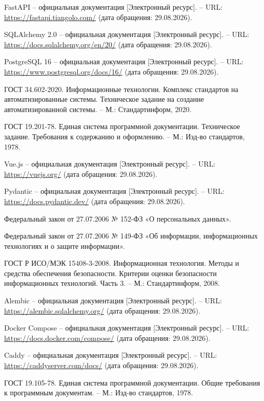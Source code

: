 \begin{numlist}
  \item FastAPI -- официальная документация [Электронный ресурс]. --
        URL: \url{https://fastapi.tiangolo.com/} (дата обращения: 29.08.2026).
  \item SQLAlchemy 2.0 -- официальная документация [Электронный
        ресурс]. -- URL: \url{https://docs.sqlalchemy.org/en/20/} (дата
        обращения: 29.08.2026).
  \item PostgreSQL 16 -- официальная документация [Электронный
        ресурс]. -- URL: \url{https://www.postgresql.org/docs/16/} (дата
        обращения: 29.08.2026).
  \item ГОСТ 34.602-2020. Информационные технологии. Комплекс
        стандартов на автоматизированные системы. Техническое задание
        на создание автоматизированной системы. -- М.: Стандартинформ,
        2020.
  \item ГОСТ 19.201-78. Единая система программной документации.
        Техническое задание. Требования к содержанию и оформлению. --
        М.: Изд-во стандартов, 1978.
  \item Vue.js -- официальная документация [Электронный ресурс]. --
        URL: \url{https://vuejs.org/} (дата обращения: 29.08.2026).
  \item Pydantic -- официальная документация [Электронный ресурс]. --
        URL: \url{https://docs.pydantic.dev/} (дата обращения: 29.08.2026).
  \item Федеральный закон от 27.07.2006 № 152-ФЗ «О персональных
        данных».
  \item Федеральный закон от 27.07.2006 № 149-ФЗ «Об информации,
        информационных технологиях и о защите информации».
  \item ГОСТ Р ИСО/МЭК 15408-3-2008. Информационная технология. Методы
        и средства обеспечения безопасности. Критерии оценки
        безопасности информационных технологий. Часть 3. -- М.:
        Стандартинформ, 2008.
  \item Alembic -- официальная документация [Электронный ресурс]. --
        URL: \url{https://alembic.sqlalchemy.org/} (дата обращения:
        29.08.2026).
  \item Docker Compose -- официальная документация [Электронный
        ресурс]. -- URL: \url{https://docs.docker.com/compose/} (дата
        обращения: 29.08.2026).
  \item Caddy -- официальная документация [Электронный ресурс]. --
        URL: \url{https://caddyserver.com/docs/} (дата обращения:
        29.08.2026).
  \item ГОСТ 19.105-78. Единая система программной документации. Общие
        требования к программным документам. -- М.: Изд-во стандартов,
        1978.
\end{numlist}

